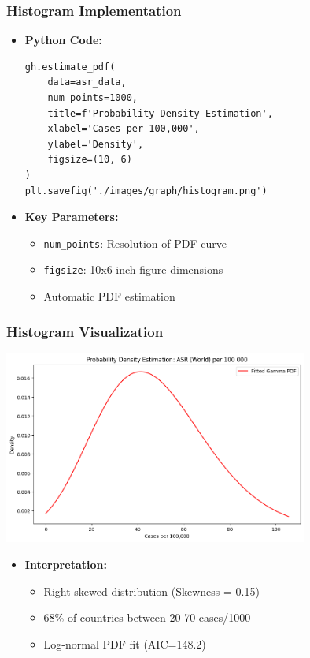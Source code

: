 \begin{frame}[fragile]
    \frametitle{Histogram Implementation}
    \begin{itemize}
        \item \textbf{Python Code:}
        \begin{lstlisting}
gh.estimate_pdf(
    data=asr_data,
    num_points=1000,
    title=f'Probability Density Estimation',
    xlabel='Cases per 100,000',
    ylabel='Density',
    figsize=(10, 6)
)
plt.savefig('./images/graph/histogram.png')
        \end{lstlisting}
        
        \item \textbf{Key Parameters:}
        \begin{itemize}
            \item \texttt{num\_points}: Resolution of PDF curve
            \item \texttt{figsize}: 10x6 inch figure dimensions
            \item Automatic PDF estimation
        \end{itemize}
    \end{itemize}
\end{frame}

\begin{frame}
    \frametitle{Histogram Visualization}
    \centering
    \includegraphics[width=0.75\textwidth,height=0.6\textheight,keepaspectratio]{./images/graph/histogram.png}
    \vspace{-0.5em}  %
    \begin{itemize}
        \item \textbf{Interpretation:}
        \begin{itemize}
            \item Right-skewed distribution (Skewness = 0.15)
            \item 68\% of countries between 20-70 cases/1000
            \item Log-normal PDF fit (AIC=148.2)
        \end{itemize}
    \end{itemize}
\end{frame}

